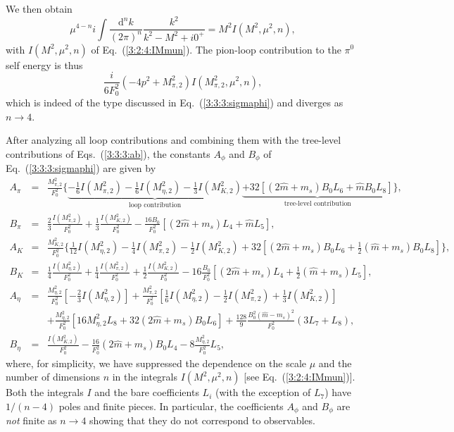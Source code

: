 \documentclass[twoside,12pt]{article}
\begin{document}
   We then obtain
$$
\mu^{4-n}i\int \frac{\mbox{d}^n k}{(2\pi)^n}\frac{k^2}{k^2-M^2+i0^+}=
M^2 I(M^2,\mu^2,n),
$$
with $I(M^2,\mu^2,n)$ of Eq.\ (\ref{3:2:4:IMmun}).
   The pion-loop contribution to the $\pi^0$ self energy is thus
$$\frac{i}{6 F^2_0}(-4p^2+M^2_{\pi,2})I(M^2_{\pi,2},\mu^2,n),$$
which is indeed of the type discussed in Eq.\ (\ref{3:3:3:sigmaphi})
and diverges as $n\to 4$.


   After analyzing all loop contributions and combining them with the tree-level
contributions of Eqs.\ (\ref{3:3:3:ab}), the constants
$A_\phi$ and $B_\phi$ of Eq.\ (\ref{3:3:3:sigmaphi}) are given by
\begin{eqnarray}
\label{3:3:3:AB}
A_\pi&=&\frac{M^2_{\pi,2}}{F^2_0}\Bigg\{
\underbrace{-\frac{1}{6}I(M^2_{\pi,2})
-\frac{1}{6}I(M^2_{\eta,2})-\frac{1}{3}I(M^2_{K,2})}_{\mbox{loop contribution}}
\underbrace{+32[(2\hat m+m_s)B_0L_6+\hat mB_0L_8]}_{\mbox{tree-level contribution}}
\Bigg\},\nonumber\\
B_\pi&=&\frac{2}{3}\frac{I(M^2_{\pi,2})}{F^2_0}+\frac{1}{3}
\frac{I(M^2_{K,2})}{F^2_0}-\frac{16B_0}{F^2_0}\left[
(2\hat m+m_s)L_4+\hat m L_5\right],\nonumber\\
A_K&=&\frac{M^2_{K,2}}{F^2_0}\Bigg\{\frac{1}{12}I(M^2_{\eta,2})
-\frac{1}{4}I(M^2_{\pi,2})-\frac{1}{2}I(M^2_{K,2})+32\left[(2\hat m+m_s)B_0L_6+\frac{1}{2}(\hat m+m_s)
B_0L_8\right]\Bigg\},\nonumber\\
B_K&=&\frac{1}{4}\frac{I(M^2_{\eta,2})}{F^2_0}
+\frac{1}{4}\frac{I(M^2_{\pi,2})}{F^2_0}
+\frac{1}{2}\frac{I(M^2_{K,2})}{F^2_0}-16 \frac{B_0}{F^2_0}\left[(2\hat m+m_s)L_4+\frac{1}{2}(\hat m
+m_s)L_5\right],
\nonumber\\
A_\eta&=&\frac{M^2_{\eta,2}}{F^2_0}\left[-\frac{2}{3}I(M^2_{\eta,2})\right]
+\frac{M^2_{\pi,2}}{F^2_0}\left[\frac{1}{6}I(M^2_{\eta,2})
-\frac{1}{2}I(M^2_{\pi,2})
+\frac{1}{3}I(M^2_{K,2})\right]\nonumber\\
&&+\frac{M^2_{\eta,2}}{F^2_0}[16M^2_{\eta,2} L_8+32(2\hat m+m_s)
B_0L_6]+\frac{128}{9}\frac{B^2_0(\hat m-m_s)^2}{F^2_0}(3L_7+L_8),\nonumber\\
B_\eta&=&\frac{I(M^2_{K,2})}{F^2_0}-\frac{16}{F^2_0}(2\hat m+m_s)B_0L_4
-8\frac{M^2_{\eta,2}}{F^2_0}L_5,
\end{eqnarray}
   where, for simplicity, we have suppressed the dependence on the
scale $\mu$ and the number of dimensions $n$ in
the integrals $I(M^2,\mu^2,n)$ [see Eq.\ (\ref{3:2:4:IMmun})].
   Both the integrals $I$ and the bare coefficients $L_i$
(with the exception of $L_7$) have $1/(n-4)$ poles and finite pieces.
   In particular, the coefficients $A_\phi$ and $B_\phi$ are {\em not}
finite as $n\to 4$ showing that they do not correspond to observables.
\end{document}
